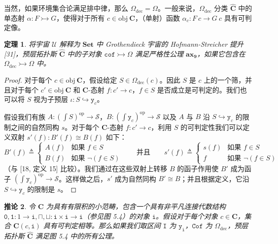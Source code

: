 \documentclass{ctexrep}
\theoremstyle{plain}
\newtheorem{theorem}{定理}[section]
\newtheorem{corollary}[theorem]{推论}
\theoremstyle{definition}
\theoremstyle{remark}
\newcommand\ttI{\mathtt{I}}
\newcommand{\ttzero}{\mathtt{0}}
\newcommand{\ttone}{\mathtt{1}}
\newcommand{\ax}[1]{\mathbf{ax_{#1}}}
\newcommand{\tti}{\mathtt{i}}
\begin{document}
当然，如果环境集合论满足排中律，那么 $\Omega_{\mathrm{dec}} = \Omega$。一般来说，$\Omega_{\mathrm{dec}}$ 分类 $\widehat{\mathbf{C}}$ 中的单态射 $\alpha : F \rightarrowtail G$，使得对于所有 $c \in \mathrm{obj}\ \mathbf{C}$，（单射）函数 $\alpha_c : F\ c \to G\ c$ 具有可判定像。

\begin{theorem}
将宇宙 $\mathcal{U}$ 解释为 $\mathbf{Set}$ 中 Grothendieck 宇宙的 Hofmann-Streicher 提升 [31]，预层拓扑斯 $\widehat{\mathbf{C}}$ 中的子对象 $\mathtt{cof} \rightarrowtail \Omega$ 满足严格性公理 $\ax{9}$，如果它包含在 $\Omega_{\mathrm{dec}} \rightarrowtail \Omega$ 中。
\end{theorem}

\begin{proof}
对于每个 $c \in \mathrm{obj}\ \mathbf{C}$，假设给定 $S \in \Omega_{\mathrm{dec}}(c)$。因此 $S$ 是 $c$ 上的一个筛，并且对于每个 $c' \in \mathrm{obj}\ \mathbf{C}$ 和 $\mathbf{C}$-态射 $f : c' \to c$，$f \in S$ 是否成立是可判定的。我们也可以将 $S$ 视为子预层 $\iota : S \hookrightarrow \mathtt{y}_c$。

假设我们有族 $A : (\int S)^{\mathrm{op}} \to \mathcal{S}$，$B : (\int \mathtt{y}_c)^{\mathrm{op}} \to \mathcal{S}$ 以及 $A$ 与 $B$ 沿 $S \hookrightarrow \mathtt{y}_c$ 的限制之间的自然同构 $s$。对于每个 $\mathbf{C}$-态射 $f : c' \to c$，利用 $S$ 的可判定性我们可以定义双射 $s'(f) : B'(f) \cong B(f)$ 如下：
\[
B'(f) \triangleq \begin{cases} A(f) & \text{如果 } f \in S \\ B(f) & \text{如果 } \neg(f \in S) \end{cases} \qquad \text{并且} \qquad s'(f) \triangleq \begin{cases} s(f) & \text{如果 } f \in S \\ f & \text{如果 } \neg(f \in S) \end{cases}
\]
（与 [18, 定义 15] 比较）。我们通过在这些双射上转移 $B$ 的函子作用使 $B'$ 成为函子 $(\int \mathtt{y}_c)^{\mathrm{op}} \to \mathcal{S}$。这样做之后，$s'$ 成为自然同构 $B' \cong B$；并且根据定义，它沿 $S \hookrightarrow \mathtt{y}_c$ 的限制是 $s$。
\end{proof}

\begin{corollary}
令 $\mathbf{C}$ 为具有有限积的小范畴，包含一个具有非平凡连接代数结构 $\ttzero, \ttone : 1 \to \tti, \sqcap, \sqcup : \tti \times \tti \to \tti$（参见图 5.4）的对象 $\tti$。假设对于每个对象 $c \in \mathbf{C}$，集合 $\mathbf{C}(c, \tti)$ 具有可判定相等。那么如果我们取区间 $\ttI$ 为 $\mathtt{y}_{\tti}$，$\mathtt{Cof}$ 为 $\Omega_{\mathrm{dec}}$，预层拓扑斯 $\widehat{\mathbf{C}}$ 满足图 5.4 中的所有公理。
\end{corollary}
\end{document}
